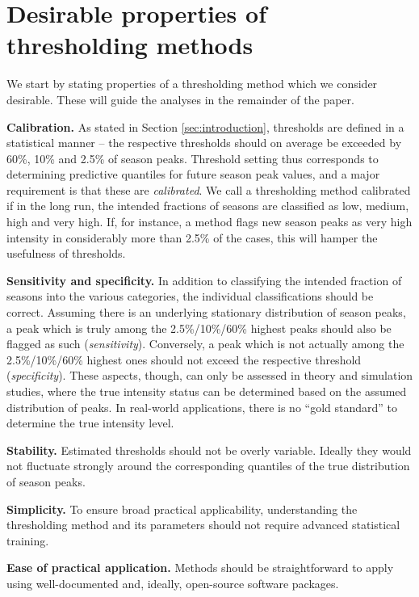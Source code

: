 \documentclass[12pt]{article}
\begin{document}
\section{Desirable properties of thresholding methods}
\label{sec:desirable_properties}

We start by stating properties of a thresholding method which we consider desirable. These will guide the analyses in the remainder of the paper.

\begin{description}
\item \textbf{Calibration.} As stated in Section \ref{sec:introduction}, thresholds are defined in a statistical manner -- the respective thresholds should on average be exceeded by 60\%, 10\% and 2.5\% of season peaks. Threshold setting thus corresponds to determining predictive quantiles for future season peak values, and a major requirement is that these are \textit{calibrated}. We call a thresholding method calibrated if in the long run, the intended fractions of seasons are classified as low, medium, high and very high. If, for instance, a method flags new season peaks as very high intensity in considerably more than 2.5\% of the cases, this will hamper the usefulness of thresholds.
\item \textbf{Sensitivity and specificity.} In addition to classifying the intended fraction of seasons into the various categories, the individual classifications should be correct. Assuming there is an underlying stationary distribution of season peaks, a peak which is truly among the 2.5\%/10\%/60\% highest peaks should also be flagged as such (\textit{sensitivity}). Conversely, a peak which is not actually among the 2.5\%/10\%/60\% highest ones should not exceed the respective threshold (\textit{specificity}). These aspects, though, can only be assessed in theory and simulation studies, where the true intensity status can be determined based on the assumed distribution of peaks. In real-world applications, there is no ``gold standard'' to determine the true intensity level.
\item \textbf{Stability.} Estimated thresholds should not be overly variable. Ideally they would not fluctuate strongly around the corresponding quantiles of the true distribution of season peaks.
\item \textbf{Simplicity.} To ensure broad practical applicability, understanding the thresholding method and its parameters should not require advanced statistical training.
\item \textbf{Ease of practical application.} Methods should be straightforward to apply using well-documented and, ideally, open-source software packages.
\end{description}
\end{document}
